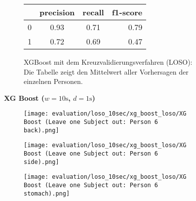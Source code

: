 \begin{figure}[ht]
    \begin{subfigure}{1\textwidth}
        \begin{center}
            \begin{tabular}{ | l | c | c | r | }
              \hline
               & precision & recall & f1-score \\ \hline
              0 & 0.93 & 0.71 & 0.79 \\ \hline
              1 & 0.72 & 0.69 & 0.47 \\
              \hline
            \end{tabular}
        \end{center}
        \caption{XGBoost mit dem Kreuzvalidierungsverfahren (LOSO): Die Tabelle zeigt den Mittelwert aller Vorhersagen der einzelnen Personen.}
        \label{implementation:app:screenshots:user_studies_information}
    \end{subfigure}
    \newline
    \vspace*{1 cm}
    \newline
    \textbf{XG Boost ($w=10\si{\s}$, $d=1\si{\s}$)}
    \begin{subfigure}{1\textwidth}
      \texttt{[image: evaluation/loso\_10sec/xg\_boost\_loso/XG Boost (Leave one Subject out: Person 6 back).png]}
    \end{subfigure}
    \begin{subfigure}{1\textwidth}
      \texttt{[image: evaluation/loso\_10sec/xg\_boost\_loso/XG Boost (Leave one Subject out: Person 6 side).png]}
    \end{subfigure}
    \begin{subfigure}{1\textwidth}
      \texttt{[image: evaluation/loso\_10sec/xg\_boost\_loso/XG Boost (Leave one Subject out: Person 6 stomach).png]}
  \end{subfigure}


\end{figure}

